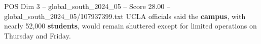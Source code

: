 \begin{textsample}{POS Dim 3 – global\_south\_2024\_05 – Score 28.00 – global\_south\_2024\_05/107937399.txt}
UCLA officials said the \textbf{campus}, with nearly 52,000 \textbf{students}, would remain shuttered except for limited operations on Thursday and Friday.

\end{textsample}
